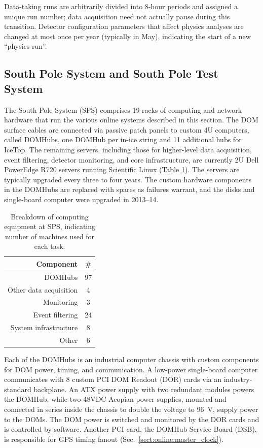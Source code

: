 Data-taking runs are arbitrarily divided into 8-hour periods and assigned
a unique run number; data acquisition need not actually pause during
this transition.  Detector configuration parameters that affect physics
analyses are changed at most once per year (typically in May), indicating
the start of a new ``physics run''.   

\subsection{\label{sect:sps}South Pole System and South Pole Test System}

The South Pole System (SPS) comprises 19 racks of computing and network
hardware that run the various online systems described in this
section.  The DOM surface cables are connected via passive patch panels to
custom 4U computers, called DOMHubs, one DOMHub per in-ice string and 11 additional
hubs for IceTop.  The remaining servers, including those for higher-level
data acquisition, event filtering, detector monitoring, and core
infrastructure, are currently 2U Dell PowerEdge R720 servers running
Scientific Linux (Table \ref{tab:sps_breakdown}).  The servers are
typically upgraded every three to four years.  The custom hardware components in
the DOMHubs are replaced with spares as failures warrant, and the disks and
single-board computer were upgraded in 2013--14.

\begin{table}[h]
  \centering
\caption{Breakdown of computing equipment at SPS, indicating number of
    machines used for each task.}
  \begin{tabular}{ r  c }
\hline
    Component & \# \\ \hline DOMHubs & 97 \\ Other data
    acquisition & 4 \\
    Monitoring & 3 \\ Event filtering & 24 \\ System infrastructure & 8 \\ Other &
    6 \\
\hline
  \end{tabular}
  \label{tab:sps_breakdown}
\end{table}

Each of the DOMHubs is an industrial computer chassis with custom components for DOM
power, timing, and communication.  A low-power single-board computer
communicates with 8 custom PCI DOM Readout (DOR) cards via an
industry-standard backplane.  An ATX power supply with two
redundant modules powers the DOMHub, while two
48VDC Acopian power supplies, mounted and connected in series inside the
chassis to double the voltage to 96~V, supply power to the DOMs.  The DOM power is switched and
monitored by the DOR cards and is controlled by software.  Another PCI
card, the DOMHub Service Board (DSB), is responsible for GPS timing fanout
(Sec.~\ref{sect:online:master_clock}).

